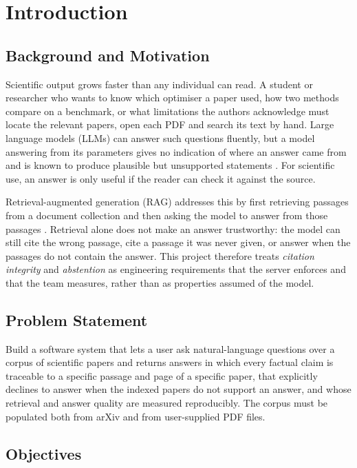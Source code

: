 \chapter{Introduction}\label{ch:intro}

\section{Background and Motivation}

Scientific output grows faster than any individual can read. A student or researcher who wants to know which
optimiser a paper used, how two methods compare on a benchmark, or what limitations the authors acknowledge must
locate the relevant papers, open each PDF and search its text by hand. Large language models (LLMs) can answer
such questions fluently, but a model answering from its parameters gives no indication of where an answer came
from and is known to produce plausible but unsupported statements \cite{ji2023hallucination}. For scientific use,
an answer is only useful if the reader can check it against the source.

Retrieval-augmented generation (RAG) addresses this by first retrieving passages from a document collection and
then asking the model to answer from those passages \cite{lewis2020rag,gao2023ragsurvey}. Retrieval alone does
not make an answer trustworthy: the model can still cite the wrong passage, cite a passage it was never given, or
answer when the passages do not contain the answer. This project therefore treats \emph{citation integrity} and
\emph{abstention} as engineering requirements that the server enforces and that the team measures, rather than as
properties assumed of the model.

\section{Problem Statement}

Build a software system that lets a user ask natural-language questions over a corpus of scientific papers and
returns answers in which every factual claim is traceable to a specific passage and page of a specific paper, that
explicitly declines to answer when the indexed papers do not support an answer, and whose retrieval and answer
quality are measured reproducibly. The corpus must be populated both from arXiv and from user-supplied PDF files.

\section{Objectives}

